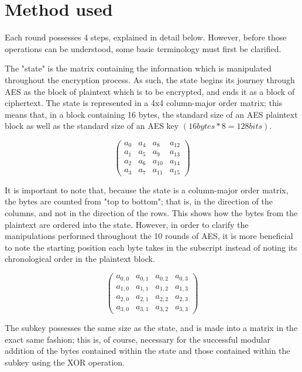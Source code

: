 \documentclass[12pt]{report}
\begin{document}
\section{Method used}
Each round possesses 4 steps, explained in detail below. However, before those operations can be understood, some basic terminology must first be clarified.

The "state" is the matrix containing the information which is manipulated throughout the encryption process. As such, the state begins its journey through AES as the block of plaintext which is to be encrypted, and ends it as a block of ciphertext. The state is represented in a 4x4 column-major order matrix; this means that, in a block containing 16 bytes, the standard size of an AES plaintext block as well as the standard size of an AES key $(16 bytes * 8 = 128 bits)$.

\[ \left( \begin{array}{cccc}
a_0 & a_4 & a_8 & a_{12} \\
a_1 & a_5 & a_9 & a_{13} \\
a_2 & a_6 & a_{10} & a_{14} \\
a_3 & a_7 & a_{11} & a_{15}\end{array} \right)\] 

It is important to note that, because the state is a column-major order matrix, the bytes are counted from "top to bottom"; that is, in the direction of the columns, and not in the direction of the rows. This shows how the bytes from the plaintext are ordered into the state. However, in order to clarify the manipulations performed throughout the 10 rounds of AES, it is more beneficial to note the starting position each byte takes in the subscript instead of noting its chronological order in the plaintext block.

\[ \left( \begin{array}{cccc}
a_{0,0} & a_{0,1} & a_{0,2} & a_{0,3} \\
a_{1,0} & a_{1,1} & a_{1,2} & a_{1,3} \\
a_{2,0} & a_{2,1} & a_{2,2} & a_{2,3} \\
a_{3,0} & a_{3,1} & a_{3,2} & a_{3,3}\end{array} \right)\] 

The subkey possesses the same size as the state, and is made into a matrix in the exact same fashion; this is, of course, necessary for the successful modular addition of the bytes contained within the state and those contained within the subkey using the XOR operation.
\end{document}
